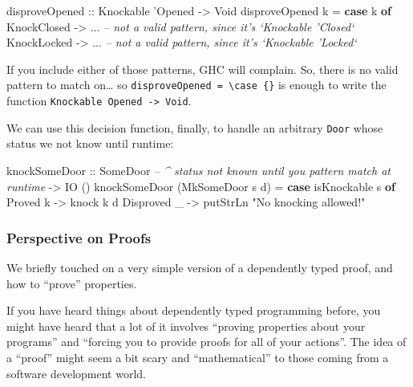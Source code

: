 \documentclass[]{article}
\newenvironment{Shaded}{}{}
\newcommand{\CommentTok}[1]{\textcolor[rgb]{0.38,0.63,0.69}{\textit{#1}}}
\newcommand{\DataTypeTok}[1]{\textcolor[rgb]{0.56,0.13,0.00}{#1}}
\newcommand{\FunctionTok}[1]{\textcolor[rgb]{0.02,0.16,0.49}{#1}}
\newcommand{\KeywordTok}[1]{\textcolor[rgb]{0.00,0.44,0.13}{\textbf{#1}}}
\newcommand{\NormalTok}[1]{#1}
\newcommand{\OtherTok}[1]{\textcolor[rgb]{0.00,0.44,0.13}{#1}}
\newcommand{\StringTok}[1]{\textcolor[rgb]{0.25,0.44,0.63}{#1}}
\begin{document}
\begin{Shaded}
\begin{Highlighting}[]
\OtherTok{disproveOpened ::} \DataTypeTok{Knockable}\NormalTok{ '}\DataTypeTok{Opened} \OtherTok{->} \DataTypeTok{Void}
\NormalTok{disproveOpened k }\FunctionTok{=} \KeywordTok{case}\NormalTok{ k }\KeywordTok{of}
    \DataTypeTok{KnockClosed} \OtherTok{->} \FunctionTok{...}    \CommentTok{-- not a valid pattern, since it's `Knockable 'Closed`}
    \DataTypeTok{KnockLocked} \OtherTok{->} \FunctionTok{...}    \CommentTok{-- not a valid pattern, since it's `Knockable 'Locked`}
\end{Highlighting}
\end{Shaded}

If you include either of those patterns, GHC will complain. So, there is no
valid pattern to match on\ldots{} so
\texttt{disproveOpened\ =\ \textbackslash{}case\ \{\}} is enough to write the
function \texttt{Knockable\ \textquotesingle{}Opened\ -\textgreater{}\ Void}.

We can use this decision function, finally, to handle an arbitrary \texttt{Door}
whose status we not know until runtime:

\begin{Shaded}
\begin{Highlighting}[]
\NormalTok{knockSomeDoor}
\OtherTok{    ::} \DataTypeTok{SomeDoor}     \CommentTok{-- ^ status not known until you pattern match at runtime}
    \OtherTok{->} \DataTypeTok{IO}\NormalTok{ ()}
\NormalTok{knockSomeDoor (}\DataTypeTok{MkSomeDoor}\NormalTok{ s d) }\FunctionTok{=} \KeywordTok{case}\NormalTok{ isKnockable s }\KeywordTok{of}
    \DataTypeTok{Proved}\NormalTok{ k    }\OtherTok{->}\NormalTok{ knock k d}
    \DataTypeTok{Disproved}\NormalTok{ _ }\OtherTok{->}\NormalTok{ putStrLn }\StringTok{"No knocking allowed!"}
\end{Highlighting}
\end{Shaded}

\hypertarget{perspective-on-proofs}{%
\subsubsection{Perspective on Proofs}\label{perspective-on-proofs}}

We briefly touched on a very simple version of a dependently typed proof, and
how to ``prove'' properties.

If you have heard things about dependently typed programming before, you might
have heard that a lot of it involves ``proving properties about your programs''
and ``forcing you to provide proofs for all of your actions''. The idea of a
``proof'' might seem a bit scary and ``mathematical'' to those coming from a
software development world.
\end{document}
